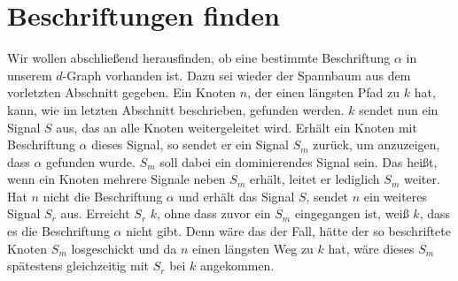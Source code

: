 \documentclass[11pt]{article}
\begin{document}
\section{Beschriftungen finden}

Wir wollen abschließend herausfinden, ob eine bestimmte Beschriftung $\alpha$ in unserem $d$-Graph vorhanden ist. Dazu sei wieder der Spannbaum aus dem vorletzten Abschnitt gegeben. Ein Knoten $n$, der einen längsten Pfad zu $k$ hat, kann, wie im letzten Abschnitt beschrieben, gefunden werden. $k$ sendet nun ein Signal $S$ aus, das an alle Knoten weitergeleitet wird. Erhält ein Knoten mit Beschriftung $\alpha$ dieses Signal, so sendet er ein Signal $S_m$ zurück, um anzuzeigen, dass $\alpha$ gefunden wurde. $S_m$ soll dabei ein dominierendes Signal sein. Das heißt, wenn ein Knoten mehrere Signale neben $S_m$ erhält, leitet er lediglich $S_m$ weiter. Hat $n$ nicht die Beschriftung $\alpha$ und erhält das Signal $S$, sendet $n$ ein weiteres Signal $S_r$ aus. Erreicht $S_r$ $k$, ohne dass zuvor ein $S_m$ eingegangen ist, weiß $k$, dass es die Beschriftung $\alpha$ nicht gibt. Denn wäre das der Fall, hätte der so beschriftete Knoten $S_m$ losgeschickt und da $n$ einen längsten Weg zu $k$ hat, wäre dieses $S_m$ spätestens gleichzeitig mit $S_r$ bei $k$ angekommen.
\printbibliography
\end{document}
